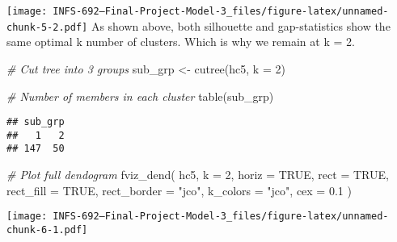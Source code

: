 \documentclass[
]{article}
\newenvironment{Shaded}{\begin{snugshade}}{\end{snugshade}}
\newcommand{\AttributeTok}[1]{\textcolor[rgb]{0.77,0.63,0.00}{#1}}
\newcommand{\CommentTok}[1]{\textcolor[rgb]{0.56,0.35,0.01}{\textit{#1}}}
\newcommand{\ConstantTok}[1]{\textcolor[rgb]{0.00,0.00,0.00}{#1}}
\newcommand{\DecValTok}[1]{\textcolor[rgb]{0.00,0.00,0.81}{#1}}
\newcommand{\FloatTok}[1]{\textcolor[rgb]{0.00,0.00,0.81}{#1}}
\newcommand{\FunctionTok}[1]{\textcolor[rgb]{0.00,0.00,0.00}{#1}}
\newcommand{\NormalTok}[1]{#1}
\newcommand{\OtherTok}[1]{\textcolor[rgb]{0.56,0.35,0.01}{#1}}
\newcommand{\SpecialCharTok}[1]{\textcolor[rgb]{0.00,0.00,0.00}{#1}}
\newcommand{\StringTok}[1]{\textcolor[rgb]{0.31,0.60,0.02}{#1}}
\begin{document}
\begin{Shaded}
\end{Shaded}

\texttt{[image: INFS-692---Final-Project-Model-3\_files/figure-latex/unnamed-chunk-5-2.pdf]}
As shown above, both silhouette and gap-statistics show the same optimal
k number of clusters. Which is why we remain at k = 2.

\begin{Shaded}
\begin{Highlighting}[]
\CommentTok{\# Cut tree into 3 groups}
\NormalTok{sub\_grp }\OtherTok{\textless{}{-}} \FunctionTok{cutree}\NormalTok{(hc5, }\AttributeTok{k =} \DecValTok{2}\NormalTok{)}

\CommentTok{\# Number of members in each cluster}
\FunctionTok{table}\NormalTok{(sub\_grp)}
\end{Highlighting}
\end{Shaded}

\begin{verbatim}
## sub_grp
##   1   2 
## 147  50
\end{verbatim}

\begin{Shaded}
\begin{Highlighting}[]
\CommentTok{\# Plot full dendogram}
\FunctionTok{fviz\_dend}\NormalTok{(}
\NormalTok{  hc5,}
  \AttributeTok{k =} \DecValTok{2}\NormalTok{,}
  \AttributeTok{horiz =} \ConstantTok{TRUE}\NormalTok{,}
  \AttributeTok{rect =} \ConstantTok{TRUE}\NormalTok{,}
  \AttributeTok{rect\_fill =} \ConstantTok{TRUE}\NormalTok{,}
  \AttributeTok{rect\_border =} \StringTok{"jco"}\NormalTok{,}
  \AttributeTok{k\_colors =} \StringTok{"jco"}\NormalTok{,}
  \AttributeTok{cex =} \FloatTok{0.1}
\NormalTok{)}
\end{Highlighting}
\end{Shaded}

\texttt{[image: INFS-692---Final-Project-Model-3\_files/figure-latex/unnamed-chunk-6-1.pdf]}
\end{document}
